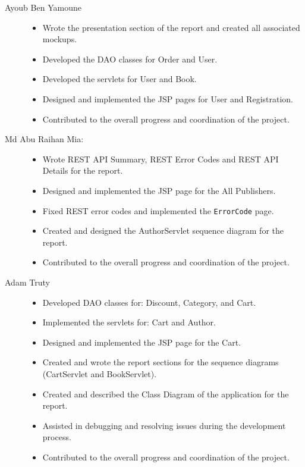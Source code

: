 \begin{description}
	\item[Ayoub Ben Yamoune] \hfill	    
	\begin{itemize}
		\item Wrote the presentation section of the report and created all associated mockups.
		\item Developed the DAO classes for Order and User.
		\item Developed the servlets for User and Book.
		\item Designed and implemented the JSP pages for User and Registration.
		\item Contributed to the overall progress and coordination of the project.
	\end{itemize}
	
	\item[Md Abu Raihan Mia:] \hfill
	\begin{itemize} 
	\item Wrote REST API Summary, REST Error Codes and REST API Details for the report.
	\item Designed and implemented the JSP page for the All Publishers.
	\item Fixed REST error codes and implemented the \texttt{ErrorCode} page.
	\item Created and designed the AuthorServlet sequence diagram for the report.
	\item Contributed to the overall progress and coordination of the project.
	\end{itemize}

	\item[Adam Truty] \hfill
	\begin{itemize}
		\item Developed DAO classes for: Discount, Category, and Cart.
		\item Implemented the servlets for: Cart and Author.
		\item Designed and implemented the JSP page for the Cart.
		\item Created and wrote the report sections for the sequence diagrams (CartServlet and BookServlet).
		\item Created and described the Class Diagram of the application for the report.
		\item Assisted in debugging and resolving issues during the development process.
		\item Contributed to the overall progress and coordination of the project.
	\end{itemize}

\end{description}
